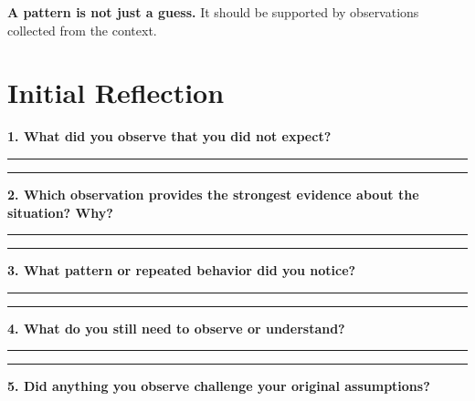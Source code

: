 \documentclass[12pt,a4paper]{article}
\begin{document}
	
	\textbf{A pattern is not just a guess.} It should be supported by observations collected from the context.
	
	\newpage
	\section*{Initial Reflection}
	
	\textbf{1. What did you observe that you did not expect?}
	
	\vspace{0.1cm}
	
	\rule{\linewidth}{0.4pt}
	
	\vspace{0.35cm}
	
	\rule{\linewidth}{0.4pt}
	
	\vspace{0.4cm}
	
	\textbf{2. Which observation provides the strongest evidence about the situation? Why?}
	
	\vspace{0.1cm}
	
	\rule{\linewidth}{0.4pt}
	
	\vspace{0.35cm}
	
	\rule{\linewidth}{0.4pt}
	
	\vspace{0.4cm}
	
	\textbf{3. What pattern or repeated behavior did you notice?}
	
	\vspace{0.1cm}
	
	\rule{\linewidth}{0.4pt}
	
	\vspace{0.35cm}
	
	\rule{\linewidth}{0.4pt}
	
	\vspace{0.4cm}
	
	\textbf{4. What do you still need to observe or understand?}
	
	\vspace{0.1cm}
	
	\rule{\linewidth}{0.4pt}
	
	\vspace{0.35cm}
	
	\rule{\linewidth}{0.4pt}
	
	\vspace{0.4cm}
	
	\textbf{5. Did anything you observe challenge your original assumptions?}
	
\end{document}
